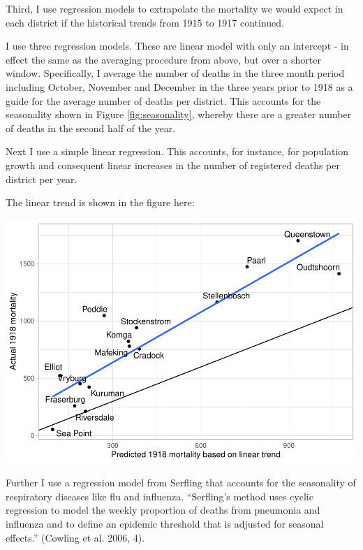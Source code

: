 \documentclass[fleqn,10pt,lineno]{wlpeerj} %
\begin{document}
Third, I use regression models to extrapolate the mortality we would expect in each district if the historical trends from 1915 to 1917 continued.

I use three regression models. These are linear model with only an intercept - in effect the same as the averaging procedure from above, but over a shorter window. Specifically, I average the number of deaths in the three month period including October, November and December in the three years prior to 1918 as a guide for the average number of deaths per district. This accounts for the seasonality shown in Figure \ref{fig:seasonality}, whereby there are a greater number of deaths in the second half of the year.

Next I use a simple linear regression. This accounts, for instance, for population growth and consequent linear increases in the number of registered deaths per district per year.

The linear trend is shown in the figure here:

\includegraphics{spanish-flu-mortality_bookdown_files/figure-latex/unnamed-chunk-5-1.pdf}

Further I use a regression model from Serfling that accounts for the seasonality of respiratory diseases like flu and influenza. ``Serfling's method uses cyclic regression to model the weekly proportion of deaths from pneumonia and influenza and to define an epidemic threshold that is adjusted for seasonal effects.'' (Cowling et al. 2006, 4).
\end{document}
